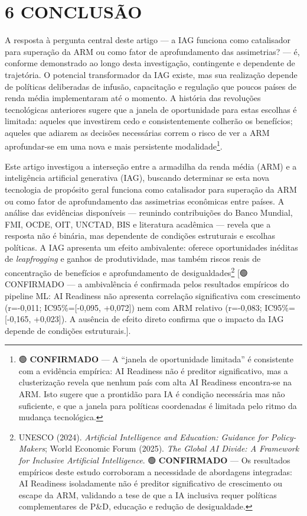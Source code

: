 \documentclass[
  brazilian,
  12pt,
]{article}
\begin{document}
\section{6 CONCLUSÃO}\label{conclusuxe3o}

A resposta à pergunta central deste artigo --- a IAG funciona como catalisador para superação da ARM ou como fator de aprofundamento das assimetrias? --- é, conforme demonstrado ao longo desta investigação, contingente e dependente de trajetória. O potencial transformador da IAG existe, mas sua realização depende de políticas deliberadas de infusão, capacitação e regulação que poucos países de renda média implementaram até o momento. A história das revoluções tecnológicas anteriores sugere que a janela de oportunidade para estas escolhas é limitada: aqueles que investirem cedo e consistentemente colherão os benefícios; aqueles que adiarem as decisões necessárias correm o risco de ver a ARM aprofundar-se em uma nova e mais persistente modalidade\footnote{🟢 \textbf{CONFIRMADO} --- A ``janela de oportunidade limitada'' é consistente com a evidência empírica: AI Readiness não é preditor significativo, mas a clusterização revela que nenhum país com alta AI Readiness encontra-se na ARM. Isto sugere que a prontidão para IA é condição necessária mas não suficiente, e que a janela para políticas coordenadas é limitada pelo ritmo da mudança tecnológica.}.

Este artigo investigou a interseção entre a armadilha da renda média (ARM) e a inteligência artificial generativa (IAG), buscando determinar se esta nova tecnologia de propósito geral funciona como catalisador para superação da ARM ou como fator de aprofundamento das assimetrias econômicas entre países. A análise das evidências disponíveis --- reunindo contribuições do Banco Mundial, FMI, OCDE, OIT, UNCTAD, BIS e literatura acadêmica --- revela que a resposta não é binária, mas dependente de condições estruturais e escolhas políticas. A IAG apresenta um efeito ambivalente: oferece oportunidades inéditas de \emph{leapfrogging} e ganhos de produtividade, mas também riscos reais de concentração de benefícios e aprofundamento de desigualdades\footnote{UNESCO (2024). \emph{Artificial Intelligence and Education: Guidance for Policy-Makers}; World Economic Forum (2025). \emph{The Global AI Divide: A Framework for Inclusive Artificial Intelligence}. 🟢 \textbf{CONFIRMADO} --- Os resultados empíricos deste estudo corroboram a necessidade de abordagens integradas: AI Readiness isoladamente não é preditor significativo de crescimento ou escape da ARM, validando a tese de que a IA inclusiva requer políticas complementares de P\&D, educação e redução de desigualdade.} {[}🟢 CONFIRMADO --- a ambivalência é confirmada pelos resultados empíricos do pipeline ML: AI Readiness não apresenta correlação significativa com crescimento (r=-0,011; IC95\%={[}-0,095, +0,072{]}) nem com ARM relativo (r=-0,083; IC95\%={[}-0,165, +0,023{]}). A ausência de efeito direto confirma que o impacto da IAG depende de condições estruturais.{]}.
\end{document}
